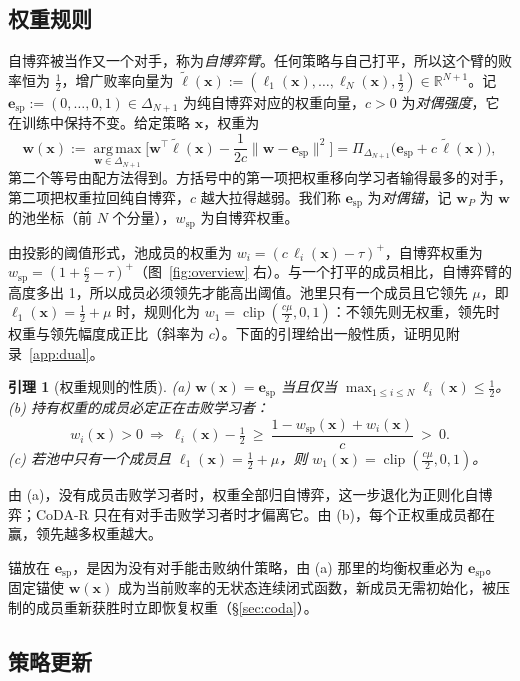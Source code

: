 \documentclass{article}
\theoremstyle{plain}
\newtheorem{lemma}[theorem]{引理}
\theoremstyle{remark}
\newcommand{\Proj}{\Pi}
\newcommand{\simplex}{\Delta}
\newcommand{\bx}{{\bm{x}}}
\newcommand{\bw}{{\bm{w}}}
\newcommand{\be}{{\bm{e}}}
\newcommand{\bell}{{\bm{\ell}}}
\newcommand{\aug}{\tilde{\bell}}
\newcommand{\esp}{\be_{\mathrm{sp}}}
\newcommand{\wsp}{w_{\mathrm{sp}}}
\newcommand{\codar}{CoDA-R}
\begin{document}
\subsection{权重规则}
\label{sec:dual}

自博弈被当作又一个对手，称为\emph{自博弈臂}。任何策略与自己打平，所以这个臂的败率恒为 $\tfrac12$，增广败率向量为 $\aug(\bx):=(\ell_1(\bx),\dots,\ell_N(\bx),\tfrac12)\in\mathbb R^{N+1}$。记 $\esp:=(0,\dots,0,1)\in\simplex_{N+1}$ 为纯自博弈对应的权重向量，$c>0$ 为\emph{对偶强度}，它在训练中保持不变。给定策略 $\bx$，权重为
\begin{equation}
\bw(\bx):=\operatorname*{arg\,max}_{\bw\in\simplex_{N+1}}\Big[\bw^\top\aug(\bx)-\frac1{2c}\|\bw-\esp\|^2\Big]=\Proj_{\simplex_{N+1}}\big(\esp+c\,\aug(\bx)\big),
\label{eq:dual}
\end{equation}
第二个等号由配方法得到。方括号中的第一项把权重移向学习者输得最多的对手，第二项把权重拉回纯自博弈，$c$ 越大拉得越弱。我们称 $\esp$ 为\emph{对偶锚}，记 $\bw_P$ 为 $\bw$ 的池坐标（前 $N$ 个分量），$\wsp$ 为自博弈权重。

由投影的阈值形式，池成员的权重为 $w_i=(c\,\ell_i(\bx)-\tau)^+$，自博弈权重为 $\wsp=(1+\tfrac c2-\tau)^+$（图~\ref{fig:overview} 右）。与一个打平的成员相比，自博弈臂的高度多出 1，所以成员必须领先才能高出阈值。池里只有一个成员且它领先 $\mu$，即 $\ell_1(\bx)=\tfrac12+\mu$ 时，规则化为 $w_1=\operatorname{clip}(\tfrac{c\mu}2,0,1)$：不领先则无权重，领先时权重与领先幅度成正比（斜率为 $c$）。下面的引理给出一般性质，证明见附录~\ref{app:dual}。

\begin{lemma}[权重规则的性质]
\label{lem:dual}
(a) $\bw(\bx)=\esp$ 当且仅当 $\max_{1\le i\le N}\ell_i(\bx)\le\tfrac12$。\\
(b) 持有权重的成员必定正在击败学习者：
\[
w_i(\bx)>0\ \Longrightarrow\ \ell_i(\bx)-\tfrac12\ \ge\ \frac{1-\wsp(\bx)+w_i(\bx)}{c}\ >\ 0 .
\]
(c) 若池中只有一个成员且 $\ell_1(\bx)=\tfrac12+\mu$，则 $w_1(\bx)=\operatorname{clip}(\tfrac{c\mu}{2},0,1)$。
\end{lemma}

由 (a)，没有成员击败学习者时，权重全部归自博弈，这一步退化为正则化自博弈；\codar{} 只在有对手击败学习者时才偏离它。由 (b)，每个正权重成员都在赢，领先越多权重越大。

锚放在 $\esp$，是因为没有对手能击败纳什策略，由 (a) 那里的均衡权重必为 $\esp$。固定锚使 $\bw(\bx)$ 成为当前败率的无状态连续闭式函数，新成员无需初始化，被压制的成员重新获胜时立即恢复权重（\S\ref{sec:coda}）。

\subsection{策略更新}
\label{sec:primal}
\end{document}
